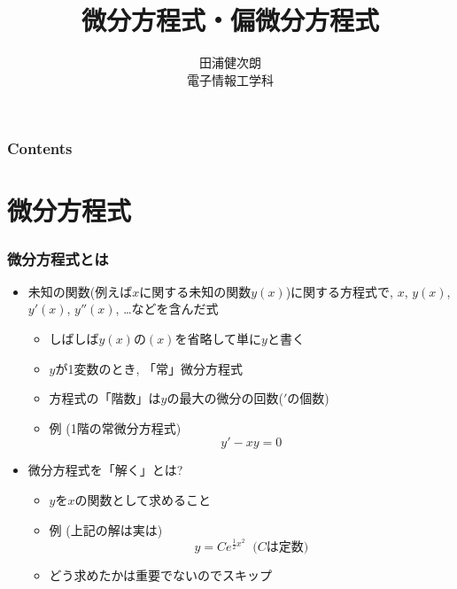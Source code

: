\documentclass[12pt,dvipdfmx]{beamer}
\title{微分方程式・偏微分方程式}
\institute{東京大学}
\author{田浦健次朗 \\ 電子情報工学科}
\date{}
\newcommand{\ao}[1]{{\color{blue}#1}}
\begin{document}
\maketitle

\begin{frame}
\frametitle{Contents}
\tableofcontents
\end{frame}

\section{微分方程式}
\begin{frame}
\frametitle{微分方程式とは}
\begin{itemize}
\item 未知の関数(例えば$x$に関する未知の関数$y(x)$)に関する方程式で,
  $x$, $y(x)$, $y'(x)$, $y''(x)$, \ldots などを含んだ式
  \begin{itemize}
  \item しばしば$y(x)$の$(x)$を省略して単に$y$と書く
  \item $y$が1変数のとき, \ao{「常」}微分方程式
  \item 方程式の\ao{「階数」}は$y$の最大の微分の回数($'$の個数)
  \item 例 (1階の常微分方程式)
    \[ y' - x y = 0 \]
  \end{itemize}
\item 微分方程式を「解く」とは?
  \begin{itemize}
  \item $y$を$x$の関数として求めること
  \item 例 (上記の解は実は)
    \[ y = Ce^{\frac{1}{2}x^2} \;\; \mbox{($C$は定数)} \]
  \item どう求めたかは重要でないのでスキップ
  \end{itemize}
\end{itemize}
\end{frame}
\end{document}
